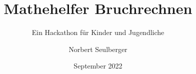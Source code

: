 \documentclass[12p,numbers=noendperiod,DIV=15]{scrartcl}
\begin{document}
	
\title{Mathehelfer Bruchrechnen}
\subtitle{Ein Hackathon für Kinder und Jugendliche}
\author{Norbert Seulberger}
\date{September 2022}

\maketitle

\tableofcontents


















\end{document}
